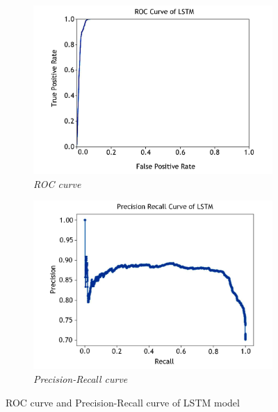 \begin{figure}[hbt!]
    \centering
    \begin{subfigure}{0.45\linewidth}
        \centering
        \includegraphics[width=\linewidth]{images/ROC_LSTM.pdf}
        \caption{\textit{ROC curve }}
        \label{fig:figure9}
    \end{subfigure}
    \hfill
    \begin{subfigure}{0.45\linewidth}
        \centering
        \includegraphics[width=\linewidth]{images/precisionRecallLSTM.pdf}
        \caption{\textit{Precision-Recall curve}}
        \label{fig:figure10}
    \end{subfigure}
    \caption{ROC curve and Precision-Recall curve of LSTM model}
    \label{fig:figure9_10}
    \vspace{-10pt}
\end{figure}
